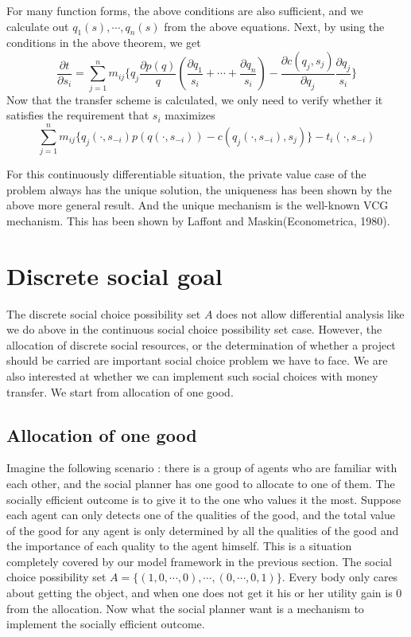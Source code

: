 For many function forms, the above conditions are also sufficient, and we calculate out ${q_1(s),\cdots,q_n(s)}$ from the above 
equations. Next, by using the conditions in the above theorem, we get 
$$\frac{\partial t}{\partial s_i} = \sum_{j=1}^{n} m_{ij}\{q_j\frac {\partial p(q)}{q}(\frac{\partial q_1}{s_i}+\cdots+\frac{\partial q_n}{s_i})-\frac {\partial c(q_j,s_j)}{\partial q_j}\frac{\partial q_j}{s_i}\}$$
Now that the transfer scheme is calculated, we only need to verify whether it satisfies the requirement that $s_i$ maximizes  
$$\sum_{j=1}^{n} m_{ij}\{q_j(\cdot,s_{-i})p(q(\cdot,s_{-i}))-c(q_j(\cdot,s_{-i}),s_j)\}-t_i(\cdot,s_{-i})$$

For this continuously differentiable situation, the private value case of the problem always has the unique solution, the uniqueness
has been shown by the above more general result. And the unique mechanism is the well-known VCG mechanism. This has been shown by
Laffont and Maskin(Econometrica, 1980). 

\section{Discrete social goal}
The discrete social choice possibility set $A$ does not allow differential analysis like we do above in the continuous social choice
possibility set case. However, the allocation of discrete social resources, or the determination of whether a project should be carried
are important social choice problem we have to face. We are also interested at whether we can implement such social choices with money
transfer. We start from allocation of one good.

\subsection{Allocation of one good  }

Imagine the following scenario : there is a group of agents who are familiar with each other, and the social planner has
one good to allocate to one of them. The socially efficient outcome is to give it to the one who 
values it the most. Suppose each agent can only detects one of the qualities of the good, and the total value of the 
good for any agent is only determined by all the qualities of the good and the importance of each quality to the agent 
himself. This is a situation completely covered by our model framework in the previous section. The social choice possibility
set $A=\{(1,0,\cdots,0),\cdots,(0,\cdots,0,1)\}$. Every body only cares about getting the object, and when one does not get it his or
her utility gain is 0 from the allocation. Now what the social planner want is a mechanism to implement the socially efficient outcome. 

